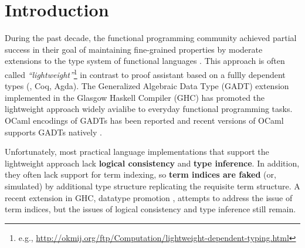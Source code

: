 \section{Introduction}
During the past decade, the functional programming community achieved
partial success in their goal of maintaining fine-grained properties
by moderate extensions to the type system of functional languages
\cite{CheHin03,CheHin02,Xi03}.
This approach is often called \emph{``lightweight''}\footnote{e.g.,
  \url{http://okmij.org/ftp/Computation/lightweight-dependent-typing.html} }
in contrast to proof assistant based on a fullly dependent types
(\eg, Coq, Agda).
The Generalized Algebraic Data Type (GADT) extension implemented
in the Glasgow Haskell Compiler (GHC) has promoted the lightweight approach
widely avialibe to everyday functional programming tasks.
OCaml encodings of GADTs has been reported \cite{ManStu09}
and recent versions of OCaml supports GADTs natively \cite{GarNor11}.

Unfortunately, most practical language implementations that support
the lightweight approach lack \textbf{logical consistency} and
\textbf{type inference}. In addition, they often lack support for
term indexing, so \textbf{term indices are faked} (or, simulated)
by additional type structure replicating the requisite term structure.
A recent extension in GHC, datatype promotion \cite{YorgeyWCJVM12},
attempts to address the issue of term indices, but the issues of
logical consistency and type inference still remain.

